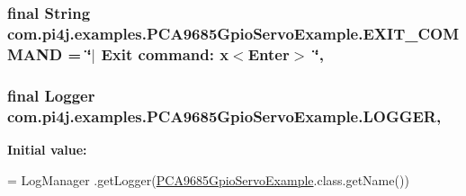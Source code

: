 \subsubsection[{E\+X\+I\+T\+\_\+\+C\+O\+M\+M\+A\+N\+D}]{\setlength{\rightskip}{0pt plus 5cm}final String com.\+pi4j.\+examples.\+P\+C\+A9685\+Gpio\+Servo\+Example.\+E\+X\+I\+T\+\_\+\+C\+O\+M\+M\+A\+N\+D = \char`\"{}$\vert$ Exit command\+: x$<$Enter$>$ \char`\"{}\hspace{0.3cm}{\ttfamily [static]}, {\ttfamily [private]}}\label{classcom_1_1pi4j_1_1examples_1_1PCA9685GpioServoExample_a3af0003c6c490dfbb20dcea768da6fd8}
\hypertarget{classcom_1_1pi4j_1_1examples_1_1PCA9685GpioServoExample_a99e52636e6c3f364d88a01dfe7bdf645}{}
\subsubsection[{L\+O\+G\+G\+E\+R}]{\setlength{\rightskip}{0pt plus 5cm}final Logger com.\+pi4j.\+examples.\+P\+C\+A9685\+Gpio\+Servo\+Example.\+L\+O\+G\+G\+E\+R\hspace{0.3cm}{\ttfamily [static]}, {\ttfamily [private]}}\label{classcom_1_1pi4j_1_1examples_1_1PCA9685GpioServoExample_a99e52636e6c3f364d88a01dfe7bdf645}
{\bfseries Initial value\+:}
\begin{DoxyCode}
= LogManager
            .getLogger(\hyperlink{classcom_1_1pi4j_1_1examples_1_1PCA9685GpioServoExample_a99aa7892d5f023a93e3a2422290f940d}{PCA9685GpioServoExample}.class.getName())
\end{DoxyCode}
\hypertarget{classcom_1_1pi4j_1_1examples_1_1PCA9685GpioServoExample_a4a1a1ba14c4378e154d2d15c35757b49}{}
